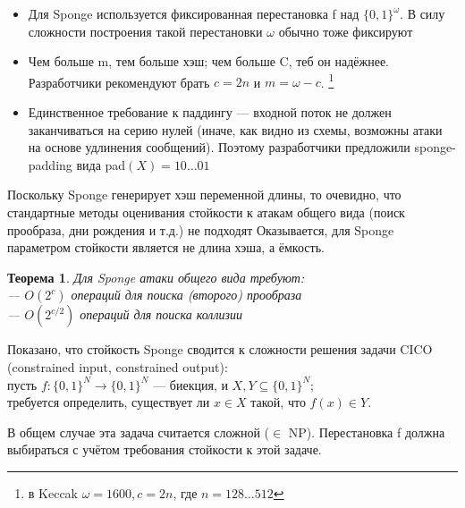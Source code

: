 \begin{itemize}
  \item Для Sponge используется фиксированная перестановка f над $\{0, 1\}^\omega$.
В силу сложности построения такой перестановки $\omega$ обычно тоже фиксируют
  \item Чем больше m, тем больше хэш; чем больше C, теб он надёжнее. Разработчики рекомендуют брать $c = 2n$ и $m = \omega - c$.
\footnote{в Keccak $\omega = 1600, c = 2n$, где $n = 128 \ldots 512$}
  \item Единственное требование к паддингу --- входной поток не должен заканчиваться
на серию нулей (иначе, как видно из схемы, возможны атаки на основе удлинения сообщений).
Поэтому разработчики предложили sponge-padding вида pad$(X) = 10\ldots01$
\end{itemize}

Поскольку Sponge генерирует хэш переменной длины, то очевидно, что стандартные методы оценивания стойкости к атакам общего вида (поиск прообраза, дни рождения и т.д.) не подходят
Оказывается, для Sponge параметром стойкости является не длина хэша, а ёмкость.


\newtheorem*{thm}{Теорема}


\begin{thm}
Для Sponge атаки общего вида требуют:\\
--- $O(2^c)$ операций для поиска (второго) прообраза\\
--- $O(2^{c/2})$ операций для поиска коллизии
\end{thm}

Показано, что стойкость Sponge сводится к сложности решения задачи CICO (constrained input, constrained output):\\
пусть $f: \{0, 1\}^N \rightarrow \{0, 1\}^N$ --- биекция, и $X, Y \subseteq\{0,1\}^N$;\\
требуется определить, существует ли $x \in X$ такой, что $f(x) \in Y$.

В общем случае эта задача считается сложной ($\in$ NP). Перестановка f должна выбираться с учётом требования стойкости к этой задаче.



